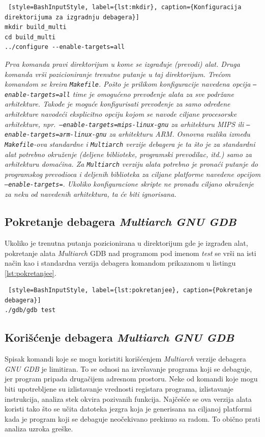 \documentclass[12pt,oneside]{memoir}
\begin{document}
\begin{lstlisting} [style=BashInputStyle, label={lst:mkdir}, caption={Konfiguracija direktorijuma za izgradnju debagera}]
mkdir build_multi
cd build_multi
../configure --enable-targets=all

\end{lstlisting}
\emph{Prva komanda pravi direktorijum u kome se izgrađuje (prevodi) alat. Druga komanda vrši pozicioniranje trenutne putanje u taj direktorijum. Trećom komandom se kreira \texttt{Makefile}. Pošto je prilikom konfiguracije navedena opcija \texttt{--enable-targets=all} time je omogućeno prevođenje alata za sve podržane arhitekture. Takođe je moguće konfigurisati prevođenje za samo određene arhitekture navodeći eksplicitno opciju kojom se navode ciljane procesorske arhitekture, npr.~\texttt{–enable-targets=mips-linux-gnu} za arhitekturu \emph{MIPS} ili \texttt{–enable-targets=arm-linux-gnu} za arhitekturu \emph{ARM}. Osnovna razlika između \texttt{Makefile}-ova standardne i \texttt{Multiarch} verzije debagera je ta što je za standardni alat potrebno okruženje (deljene biblioteke, programski prevodilac, itd.) samo za arhitekturu domaćina. Za \texttt{Multiarch} verziju alata potrebno je pronaći putanje do programskog prevodioca i deljenih biblioteka za ciljane platforme navedene opcijom \texttt{--enable-targets=}. Ukoliko konfiguracione skripte ne pronađu ciljano okruženje za neku od navedenih arhitektura, ta će biti ignorisana.}

\subsection{Pokretanje debagera \emph{Multiarch GNU GDB}}

Ukoliko je trenutna putanja pozicionirana u direktorijum gde je izgrađen alat, pokretanje alata \emph{Multiarch} GDB nad programom pod imenom \emph{test} se vrši na isti način kao i standardna verzija debagera komandom prikazanom u listingu \ref{lst:pokretanjee}.
\begin{lstlisting} [style=BashInputStyle, label={lst:pokretanjee}, caption={Pokretanje debagera}]
./gdb/gdb test

\end{lstlisting}

\subsection{Korišćenje debagera \emph{Multiarch GNU GDB}}

Spisak komandi koje se mogu koristiti korišćenjem \emph{Multiarch} verzije debagera \emph{GNU GDB} je limitiran. To se odnosi na izvršavanje programa koji se debaguje, jer program pripada drugačijem adresnom prostoru. Neke od komandi koje mogu biti upotrebljene su izlistavanje vrednosti registara programa, izlistavanje instrukcija, analiza stek okvira pozivanih funkcija. Najčešće se ova verzija alata koristi tako što se učita datoteka jezgra koja je generisana na ciljanoj platformi kada je program koji se debaguje neočekivano prekinuo sa radom. To obično prati analiza uzroka greške.
\end{document}
